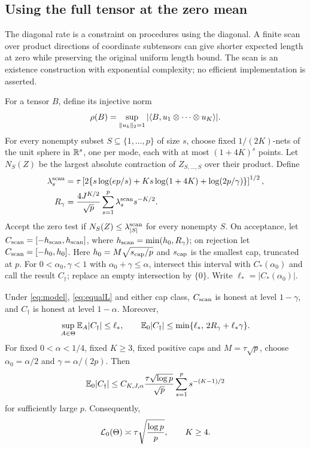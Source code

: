 
\subsection{Using the full tensor at the zero mean}\label{sec:full_scan}

The diagonal rate is a constraint on procedures using the diagonal. A finite scan over product directions of coordinate subtensors can give shorter expected length at zero while preserving the original uniform length bound. The scan is an existence construction with exponential complexity; no efficient implementation is asserted.

For a tensor $B$, define its injective norm
\[
 \rho(B)=\sup_{\lVert u_k\rVert_2=1}
       |\langle B,u_1\otimes\cdots\otimes u_K\rangle|.
\]
For every nonempty subset $S\subseteq\{1,\ldots,p\}$ of size $s$, choose fixed $1/(2K)$-nets of the unit sphere in $\mathbb R^s$, one per mode, each with at most $(1+4K)^s$ points. Let $N_S(Z)$ be the largest absolute contraction of $Z_{S,\ldots,S}$ over their product. Define
\begin{align}
 \lambda_s^{\rm scan}
 &=\tau\left[2\{s\log(ep/s)+Ks\log(1+4K)+\log(2p/\gamma)\}\right]^{1/2},
 \label{eq:scan_threshold}\\
 R_\gamma
 &=\frac{4J^{K/2}}{\sqrt p}
       \sum_{s=1}^p\lambda_s^{\rm scan}s^{-K/2}.
 \label{eq:scan_radius}
\end{align}
Accept the zero test if $N_S(Z)\le\lambda_{|S|}^{\rm scan}$ for every nonempty $S$. On acceptance, let $C_{\rm scan}=[-h_{\rm scan},h_{\rm scan}]$, where $h_{\rm scan}=\min(h_0,R_\gamma)$; on rejection let $C_{\rm scan}=[-h_0,h_0]$. Here $h_0=M\sqrt{s_{\rm cap}/p}$ and $s_{\rm cap}$ is the smallest cap, truncated at $p$. For $0<\alpha_0,\gamma<1$ with $\alpha_0+\gamma\le\alpha$, intersect this interval with $C_*(\alpha_0)$ and call the result $C_\dagger$; replace an empty intersection by $\{0\}$. Write $\ell_*=|C_*(\alpha_0)|$.

\begin{theorem}\label{thm:scan}
Under \eqref{eq:model}, \eqref{eq:equalL} and either cap class, $C_{\rm scan}$ is honest at level $1-\gamma$, and $C_\dagger$ is honest at level $1-\alpha$. Moreover,
\begin{equation}\label{eq:scan_expectation}
 \sup_{A\in\Theta}\mathbb E_A|C_\dagger|\le\ell_*,
 \qquad
 \mathbb E_0|C_\dagger|\le
 \min\{\ell_*,\,2R_\gamma+\ell_*\gamma\}.
\end{equation}
For fixed $0<\alpha<1/4$, fixed $K\ge3$, fixed positive caps and $M=\tau\sqrt p$, choose $\alpha_0=\alpha/2$ and $\gamma=\alpha/(2p)$. Then
\begin{equation}\label{eq:scan_rate}
 \mathbb E_0|C_\dagger|
 \le C_{K,J,\alpha}\frac{\tau\sqrt{\log p}}{\sqrt p}
       \sum_{s=1}^p s^{-(K-1)/2}
\end{equation}
for sufficiently large $p$. Consequently,
\begin{equation}\label{eq:zero_sharp}
 \mathcal L_0(\Theta)\asymp\tau\sqrt{\frac{\log p}{p}},
 \qquad K\ge4.
\end{equation}
\end{theorem}

